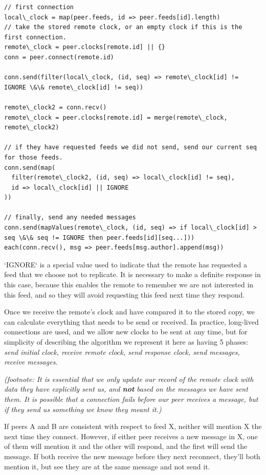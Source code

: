 \documentclass[sigconf]{acmart}
\begin{document}
\begin{verbatim}
// first connection
local\_clock = map(peer.feeds, id => peer.feeds[id].length)
// take the stored remote clock, or an empty clock if this is the first connection.
remote\_clock = peer.clocks[remote.id] || {}
conn = peer.connect(remote.id)

conn.send(filter(local\_clock, (id, seq) => remote\_clock[id] != IGNORE \&\& remote\_clock[id] != seq))

remote\_clock2 = conn.recv()
remote\_clock = peer.clocks[remote.id] = merge(remote\_clock, remote\_clock2)

// if they have requested feeds we did not send, send our current seq for those feeds.
conn.send(map(
  filter(remote\_clock2, (id, seq) => local\_clock[id] != seq),
  id => local\_clock[id] || IGNORE
))

// finally, send any needed messages
conn.send(mapValues(remote\_clock, (id, seq) => if local\_clock[id] > seq \&\& seq != IGNORE then peer.feeds[id][seq...]))
each(conn.recv(), msg => peer.feeds[msg.author].append(msg))
\end{verbatim}

`IGNORE` is a special value used to indicate that the remote has
requested a feed that we choose not to replicate.  It is necessary to
make a definite response in this case, because this enables the remote
to remember we are not interested in this feed, and so they will avoid
requesting this feed next time they respond.

Once we receive the remote's clock and have compared it to the stored
copy, we can calculate everything that needs to be send or
received. In practice, long-lived connections are used, and we allow
new clocks to be sent at any time, but for simplicity of describing
the algorithm we represent it here as having 5 phases: {\em send initial
clock, receive remote clock, send response clock, send messages,
receive messages}.

{\em (footnote: It is essential that we only update our record of the
  remote clock with data they have explicitly sent us, and {\bf not}
  based on the messages we have sent them. It is possible that a
  connection fails before our peer receives a message, but if they
  send us something we know they meant it.)}

If peers A and B are consistent with respect to feed X, neither will
mention X the next time they connect.  However, if either peer
receives a new message in X, one of them will mention it and the other
will respond, and the first will send the message. If both receive the
new message before they next reconnect, they'll both mention it, but
see they are at the same message and not send it.
\end{document}
